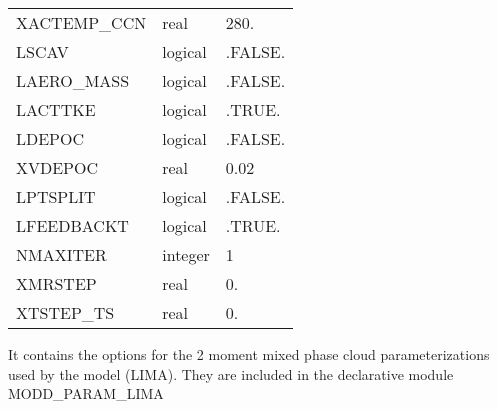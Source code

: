 \begin{center}
\begin{tabular} {|l|l|l|}
XACTEMP\_CCN & real  & 280. \\
LSCAV & logical  & .FALSE.  \\
LAERO\_MASS & logical  & .FALSE.  \\
LACTTKE & logical  & .TRUE.  \\
LDEPOC & logical  & .FALSE.  \\
XVDEPOC &real& 0.02 \\
LPTSPLIT & logical  & .FALSE.  \\
LFEEDBACKT & logical  & .TRUE.  \\
NMAXITER & integer & 1 \\
XMRSTEP&real& 0. \\
XTSTEP\_TS&real&0.\\
\hline
\end{tabular}
\end{center}
It contains the options for the 2 moment mixed phase cloud parameterizations
used  by the model (LIMA). They are included in the declarative module
MODD\_PARAM\_LIMA
